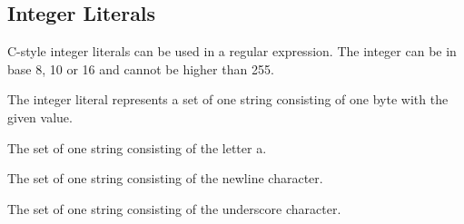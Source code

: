 
\subsection{Integer Literals}
{
	C-style integer literals can be used in a regular expression.
	The integer can be in base 8, 10 or 16 and cannot be higher than 255.
	
	The integer literal represents a set of one string consisting of one byte
	with the given value.
	
	\begin{itemize}
	{
		\item[\texttt{95}] The set of one string consisting of the letter a.
		
		\item[\texttt{012}] The set of one string consisting of the
			newline character.
		
		\item[\texttt{0x5F}] The set of one string consisting of the
			underscore character.
	}
	\end{itemize}
}
